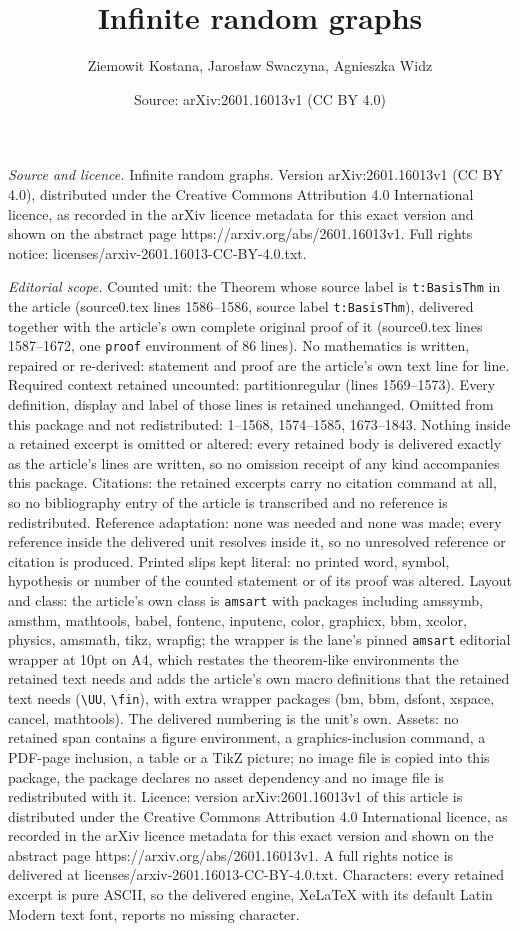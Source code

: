 \documentclass[10pt,a4paper]{amsart}
\title[Infinite random graphs]{Infinite random graphs}
\author{Ziemowit Kostana, Jaros{\l}aw Swaczyna, Agnieszka Widz}
\date{Source: arXiv:2601.16013v1 (CC BY 4.0)}
\begin{document}
\maketitle

\noindent\emph{Source and licence.} Infinite random graphs. Version arXiv:2601.16013v1 (CC BY 4.0), distributed under the Creative Commons Attribution 4.0 International licence, as recorded in the arXiv licence metadata for this exact version and shown on the abstract page https://arxiv.org/abs/2601.16013v1. Full rights notice: licenses/arxiv-2601.16013-CC-BY-4.0.txt.\par\smallskip

\noindent\textit{Editorial scope.} Counted unit: the Theorem whose source label is \texttt{t:BasisThm} in the article (source0.tex lines 1586--1586, source label \texttt{t:BasisThm}), delivered together with the article's own complete original proof of it (source0.tex lines 1587--1672, one \texttt{proof} environment of 86 lines). No mathematics is written, repaired or re-derived: statement and proof are the article's own text line for line. Required context retained uncounted: partitionregular (lines 1569--1573). Every definition, display and label of those lines is retained unchanged. Omitted from this package and not redistributed: 1--1568, 1574--1585, 1673--1843. Nothing inside a retained excerpt is omitted or altered: every retained body is delivered exactly as the article's lines are written, so no omission receipt of any kind accompanies this package. Citations: the retained excerpts carry no citation command at all, so no bibliography entry of the article is transcribed and no reference is redistributed. Reference adaptation: none was needed and none was made; every reference inside the delivered unit resolves inside it, so no unresolved reference or citation is produced. Printed slips kept literal: no printed word, symbol, hypothesis or number of the counted statement or of its proof was altered. Layout and class: the article's own class is \texttt{amsart} with packages including amssymb, amsthm, mathtools, babel, fontenc, inputenc, color, graphicx, bbm, xcolor, physics, amsmath, tikz, wrapfig; the wrapper is the lane's pinned \texttt{amsart} editorial wrapper at 10pt on A4, which restates the theorem-like environments the retained text needs and adds the article's own macro definitions that the retained text needs (\texttt{\textbackslash UU}, \texttt{\textbackslash fin}), with extra wrapper packages (bm, bbm, dsfont, xspace, cancel, mathtools). The delivered numbering is the unit's own. Assets: no retained span contains a figure environment, a graphics-inclusion command, a PDF-page inclusion, a table or a TikZ picture; no image file is copied into this package, the package declares no asset dependency and no image file is redistributed with it. Licence: version arXiv:2601.16013v1 of this article is distributed under the Creative Commons Attribution 4.0 International licence, as recorded in the arXiv licence metadata for this exact version and shown on the abstract page https://arxiv.org/abs/2601.16013v1. A full rights notice is delivered at licenses/arxiv-2601.16013-CC-BY-4.0.txt. Characters: every retained excerpt is pure ASCII, so the delivered engine, XeLaTeX with its default Latin Modern text font, reports no missing character.
\end{document}
